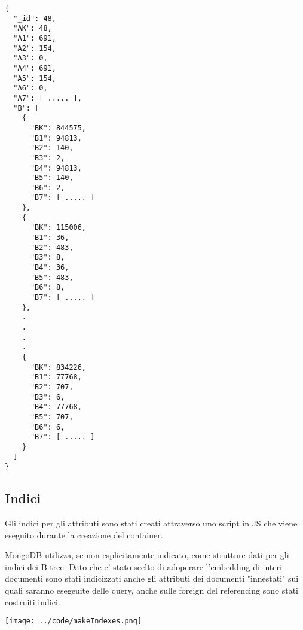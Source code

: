 \begin{Verbatim}[frame=single,framesep=2mm,label= Embedding di B in A,labelposition=all]
{
  "_id": 48,
  "AK": 48,
  "A1": 691,
  "A2": 154,
  "A3": 0,
  "A4": 691,
  "A5": 154,
  "A6": 0,
  "A7": [ ..... ],
  "B": [
    {
      "BK": 844575,
      "B1": 94813,
      "B2": 140,
      "B3": 2,
      "B4": 94813,
      "B5": 140,
      "B6": 2,
      "B7": [ ..... ]
    },
    {
      "BK": 115006,
      "B1": 36,
      "B2": 483,
      "B3": 8,
      "B4": 36,
      "B5": 483,
      "B6": 8,
      "B7": [ ..... ]
    },
    .
    .
    .
    .
    {
      "BK": 834226,
      "B1": 77768,
      "B2": 707,
      "B3": 6,
      "B4": 77768,
      "B5": 707,
      "B6": 6,
      "B7": [ ..... ]
    }
  ]
}
\end{Verbatim}
\subsection{Indici}

Gli indici per gli attributi sono stati creati attraverso uno script in JS che viene eseguito durante la creazione del container.

MongoDB utilizza, se non esplicitamente indicato, come strutture dati per gli indici dei B-tree. Dato che e' stato scelto di adoperare l'embedding di interi documenti sono stati 
indicizzati anche gli attributi dei documenti "innestati" sui quali saranno esegeuite delle query, anche sulle foreign del referencing sono stati costruiti indici.

\begin{center}
  \texttt{[image: ../code/makeIndexes.png]}
\end{center}

